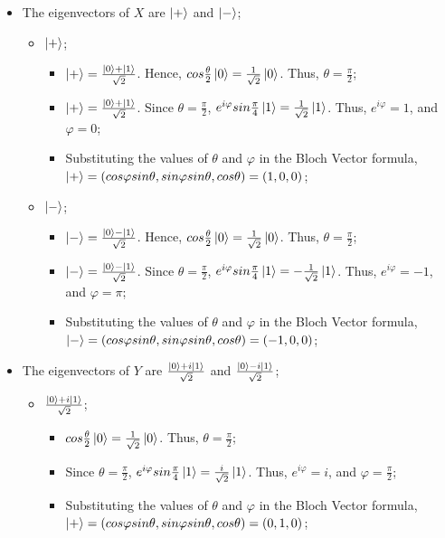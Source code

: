 \begin{itemize}
    \item The eigenvectors of $X$ are $\ket+$ and $\ket -$;
    \begin{itemize}
        \item $\ket +$;
        \begin{itemize}
            \item $\ket+ = \frac{\ket0 + \ket1}{\sqrt2}$. Hence,
                $cos \frac \theta 2 \ket0 = \frac{1}{\sqrt2} \ket0$. Thus,
                $\theta = \frac \pi 2$;
            \item $\ket+ = \frac{\ket0 + \ket1}{\sqrt2}$. Since
                $\theta = \frac \pi 2$,
                $e^{i \varphi} sin \frac \pi 4 \ket1 = \frac{1}{\sqrt2} \ket1$. Thus,
                $e^{i \varphi} = 1$, and $\varphi = 0$;
            \item Substituting the values of $\theta$ and $\varphi$ in the Bloch Vector formula,
                $\ket+ = (cos\varphi sin\theta, sin\varphi sin\theta, cos\theta) = (1, 0, 0)$;
        \end{itemize}
        
        \item $\ket -$;
        \begin{itemize}
            \item $\ket- = \frac{\ket0 - \ket1}{\sqrt2}$. Hence,
                $cos \frac \theta 2 \ket0 = \frac{1}{\sqrt2} \ket0$. Thus,
                $\theta = \frac \pi 2$;
            \item $\ket- = \frac{\ket0 - \ket1}{\sqrt2}$. Since
                $\theta = \frac \pi 2$,
                $e^{i \varphi} sin \frac \pi 4 \ket1 = - \frac{1}{\sqrt2} \ket1$. Thus,
                $e^{i \varphi} = -1$, and $\varphi = \pi$;
            \item Substituting the values of $\theta$ and $\varphi$ in the Bloch Vector formula,
                $\ket- = (cos\varphi sin\theta, sin\varphi sin\theta, cos\theta) = (-1, 0, 0)$;
        \end{itemize}
    \end{itemize}
    
    \item The eigenvectors of $Y$ are $\frac{\ket0 + i \ket1}{\sqrt2}$ and $\frac{\ket0 - i \ket1}{\sqrt2}$;
    \begin{itemize}
        \item $\frac{\ket0 + i \ket1}{\sqrt2}$;
        \begin{itemize}
            \item $cos \frac \theta 2 \ket0 = \frac{1}{\sqrt2} \ket0$. Thus,
                $\theta = \frac \pi 2$;
            \item Since $\theta = \frac \pi 2$,
                $e^{i \varphi} sin \frac \pi 4 \ket1 = \frac{i}{\sqrt2} \ket1$. Thus,
                $e^{i \varphi} = i$, and $\varphi = \frac \pi 2$;
            \item Substituting the values of $\theta$ and $\varphi$ in the Bloch Vector formula,
                $\ket+ = (cos\varphi sin\theta, sin\varphi sin\theta, cos\theta) = (0, 1, 0)$;
        \end{itemize}
        

\end{itemize}
\end{itemize}
